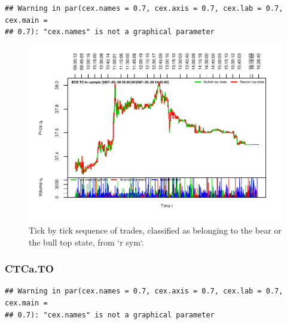 \documentclass[]{article}
\begin{document}
\begin{verbatim}
## Warning in par(cex.names = 0.7, cex.axis = 0.7, cex.lab = 0.7, cex.main =
## 0.7): "cex.names" is not a graphical parameter
\end{verbatim}

\begin{figure}[H]
\includegraphics[width=\textwidth]{main_files/figure-latex/unnamed-chunk-28-1} \caption{Tick by tick sequence of trades, classified as belonging to the bear or the bull top state, from `r sym`.}\label{fig:unnamed-chunk-28}
\end{figure}

\newpage

\subsubsection{CTCa.TO}\label{ctca.to}

\begin{verbatim}
## Warning in par(cex.names = 0.7, cex.axis = 0.7, cex.lab = 0.7, cex.main =
## 0.7): "cex.names" is not a graphical parameter
\end{verbatim}
\end{document}
